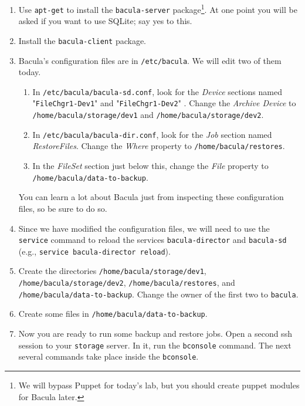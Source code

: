 \documentclass{article}   	%
\begin{document}
\begin{enumerate}
  \item Use \texttt{apt-get} to install the \texttt{bacula-server} package\footnote{We will bypass Puppet for today's lab, but you should create puppet modules for Bacula later.}.  At one point you will be asked if you want to use SQLite; say yes to this.  

  \item Install the \texttt{bacula-client} package.

  \item Bacula's configuration files are in \texttt{/etc/bacula}. We will edit two of them today.
        \begin{enumerate}
            \item In \texttt{/etc/bacula/bacula-sd.conf}, look for the \emph{Device} sections named "\texttt{FileChgr1-Dev1}" and "\texttt{FileChgr1-Dev2}" .  Change the \emph{Archive Device} to 
	          \texttt{/home/bacula/storage/dev1} and  \texttt{/home/bacula/storage/dev2}.

	    \item In \texttt{/etc/bacula/bacula-dir.conf}, look for the \emph{Job} section named \emph{RestoreFiles}.  Change the \emph{Where} property
	          to \texttt{/home/bacula/restores}.

	    \item In the \emph{FileSet} section just below this, change the \emph{File} property to \texttt{/home/bacula/data-to-backup}.
	\end{enumerate}

	You can learn a lot about Bacula just from inspecting these configuration files, so be sure to do so.

  \item Since we have modified the configuration files, we will need to use the \texttt{service} command to reload the services 
        \texttt{bacula-director} and \texttt{bacula-sd} (e.g., \texttt{service bacula-director reload}).

  \item Create the directories \texttt{/home/bacula/storage/dev1}, \texttt{/home/bacula/storage/dev2}, \texttt{/home/bacula/restores}, and \texttt{/home/bacula/data-to-backup}.
        Change the owner of the first two to \texttt{bacula}.

  \item Create some files in \texttt{/home/bacula/data-to-backup}.

  \item Now you are ready to run some backup and restore jobs.  Open a second ssh session to your \texttt{storage} server. In it, run the 
        \texttt{bconsole} command.  The next several commands take place inside the \texttt{bconsole}.


\end{enumerate}
\end{document}
